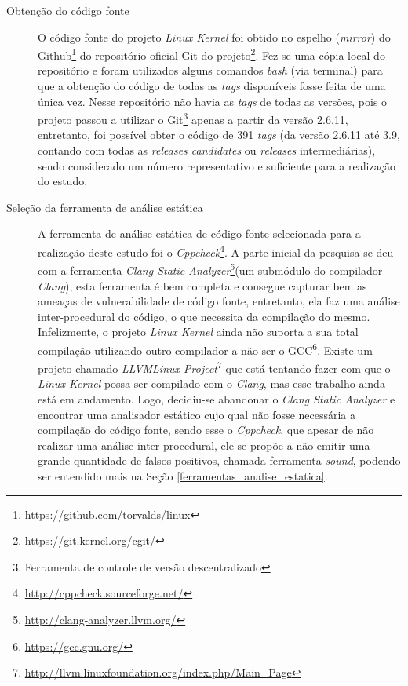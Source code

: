 \begin{description}

\item[Obtenção do código fonte]

O código fonte do projeto \textit{Linux Kernel} foi obtido no espelho
(\textit{mirror}) do Github\footnote{\url{https://github.com/torvalds/linux}}
do repositório oficial Git do
projeto\footnote{\url{https://git.kernel.org/cgit/}}.  Fez-se uma cópia local
do repositório e foram utilizados alguns comandos \textit{bash} (via terminal)
para que a obtenção do código de todas as \textit{tags} disponíveis fosse feita
de uma única vez. Nesse repositório não havia as \textit{tags} de todas as
versões, pois o projeto passou a utilizar o Git\footnote{Ferramenta de controle
de versão descentralizado} apenas a partir da versão 2.6.11, entretanto, foi
possível obter o código de 391 \textit{tags} (da versão 2.6.11 até 3.9, contando
com todas as \textit{releases candidates} ou \textit{releases} intermediárias),
sendo considerado um número representativo e suficiente para a realização do
estudo.

\item[Seleção da ferramenta de análise estática]

A ferramenta de análise estática de código fonte selecionada para a realização
deste estudo foi o
\textit{Cppcheck}\footnote{\url{http://cppcheck.sourceforge.net/}}.  A parte
inicial da pesquisa se deu com a ferramenta \textit{Clang Static
Analyzer}\footnote{\url{http://clang-analyzer.llvm.org/}}(um submódulo do
compilador \textit{Clang}), esta ferramenta é bem completa e consegue capturar
bem as ameaças de vulnerabilidade de código fonte, entretanto, ela faz uma
análise inter-procedural do código, o que necessita da compilação do mesmo.
Infelizmente, o projeto \textit{Linux Kernel} ainda não suporta a sua total
compilação utilizando outro compilador a não ser o
GCC\footnote{\url{https://gcc.gnu.org/}}. Existe um projeto chamado
\textit{LLVMLinux
Project}\footnote{\url{http://llvm.linuxfoundation.org/index.php/Main_Page}} que
está tentando fazer com que o \textit{Linux Kernel} possa ser compilado com o
\textit{Clang}, mas esse trabalho ainda está em andamento. Logo, decidiu-se
abandonar o \textit{Clang Static Analyzer} e encontrar uma analisador estático
cujo qual não fosse necessária a compilação do código fonte, sendo esse o
\textit{Cppcheck}, que apesar de não realizar uma análise inter-procedural, ele
se propõe a não emitir uma grande quantidade de falsos positivos, chamada
ferramenta \textit{sound}, podendo ser entendido mais na Seção
\ref{ferramentas_analise_estatica}.


\end{description}
